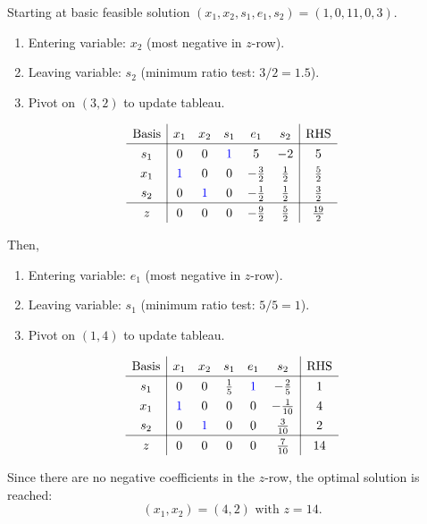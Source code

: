 \documentclass[a4paper, 10pt]{article}
\begin{document}
\begin{solution}
\newpage

Starting at basic feasible solution \( (x_1, x_2, s_1, e_1, s_2) = (1, 0, 11, 0, 3) \).
\begin{enumerate}
    \item Entering variable: \( x_2 \) (most negative in \( z \)-row).
    \item Leaving variable: \( s_2 \) (minimum ratio test: \( 3/2 = 1.5 \)).
    \item Pivot on \( (3,2) \) to update tableau.
\end{enumerate}
\[
\renewcommand{\arraystretch}{1.3}
\begin{array}{c|ccccc|c}
    \text{Basis} & x_1 & x_2 & s_1 & e_1 & s_2 & \text{RHS} \\
    \hline
    s_1 & 0 & 0 & \textcolor[HTML]{0000FF}{1} & 5 & -2 & 5 \\
    x_1 & \textcolor[HTML]{0000FF}{1} & 0 & 0 & -\frac{3}{2} & \frac{1}{2} & \frac{5}{2} \\
    s_2 & 0 & \textcolor[HTML]{0000FF}{1} & 0 & -\frac{1}{2} & \frac{1}{2} & \frac{3}{2} \\
    \hline
    z & 0 & 0 & 0 & -\frac{9}{2} & \frac{5}{2} & \frac{19}{2} \\
\end{array}
\]

Then,
\begin{enumerate}
    \item Entering variable: \( e_1 \) (most negative in \( z \)-row).
    \item Leaving variable: \( s_1 \) (minimum ratio test: \( 5/5 = 1 \)).
    \item Pivot on \( (1,4) \) to update tableau.
\end{enumerate}
\[
\renewcommand{\arraystretch}{1.3}
\begin{array}{c|ccccc|c}
    \text{Basis} & x_1 & x_2 & s_1 & e_1 & s_2 & \text{RHS} \\
    \hline
    s_1 & 0 & 0 & \frac{1}{5} & \textcolor[HTML]{0000FF}{1} & -\frac{2}{5} & 1 \\
    x_1 & \textcolor[HTML]{0000FF}{1} & 0 & 0 & 0 & -\frac{1}{10} & 4 \\
    s_2 & 0 & \textcolor[HTML]{0000FF}{1} & 0 & 0 & \frac{3}{10} & 2 \\
    \hline
    z & 0 & 0 & 0 & 0 & \frac{7}{10} & 14 \\
\end{array}
\]

Since there are no negative coefficients in the \( z \)-row, the optimal solution is reached:
\[ \boxed{(x_1, x_2) = (4, 2) \text{ with }z = 14}. \]
\end{solution}
\end{document}
